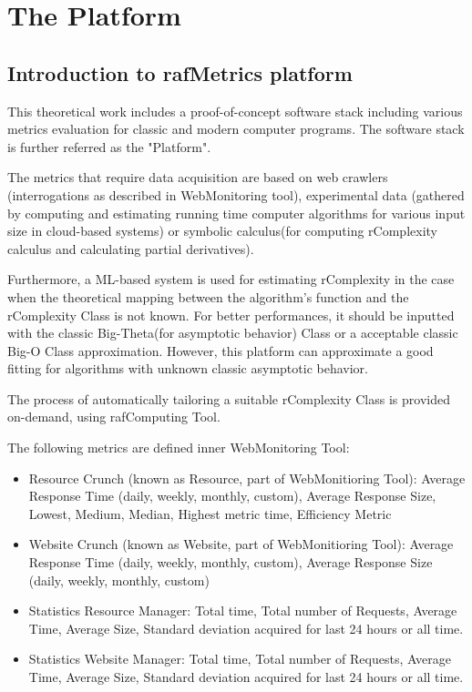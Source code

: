 \chapter{The Platform}


\section{Introduction to rafMetrics platform}
This theoretical work includes a proof-of-concept software stack including various metrics evaluation for classic and modern computer programs. The software stack is further referred as the "Platform".

The metrics that require data acquisition are based on web crawlers (interrogations as described in WebMonitoring tool), experimental data (gathered by computing and estimating running time computer algorithms for various input size in cloud-based systems) or symbolic calculus(for computing rComplexity calculus and calculating partial derivatives).

Furthermore, a ML-based system is used for estimating rComplexity in the case when the theoretical mapping between the algorithm's function and the rComplexity Class is not known. For better performances, it should be inputted with the classic Big-Theta(for asymptotic behavior) Class or a acceptable classic Big-O Class approximation. However, this platform can approximate a good fitting for algorithms with unknown classic asymptotic behavior. 

The process of automatically tailoring a suitable rComplexity Class is provided on-demand, using rafComputing Tool.





The following metrics are defined inner WebMonitoring Tool:
\begin{itemize}
	\item Resource Crunch (known as Resource, part of WebMonitioring Tool): Average Response Time (daily, weekly, monthly, custom), Average Response Size, Lowest, Medium, Median, Highest metric time, Efficiency Metric	
	\item Website Crunch (known as Website, part of WebMonitioring Tool): Average Response Time (daily, weekly, monthly, custom), Average Response Size (daily, weekly, monthly, custom)
	\item Statistics Resource Manager: Total time, Total number of Requests, Average Time, Average Size, Standard deviation acquired for last 24 hours or all time.
	\item Statistics Website Manager: Total time, Total number of Requests, Average Time, Average Size, Standard deviation acquired for last 24 hours or all time.

	

\end{itemize}


